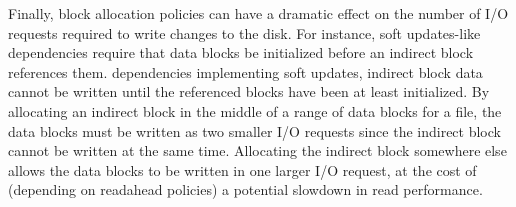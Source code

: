 \begin{comment}
The buffer cache and a few other \modules\ perform better in the
common case that each block's \patches\ are listed in order of creation
time,
%
taking $O(n)$ time to process $n$ patches rather than $O(n^2)$.
\end{comment}

Finally, block allocation policies can have a dramatic effect on the number of
I/O requests required to write changes to the disk. For instance, soft
updates-like dependencies require that data blocks be initialized before
an indirect block references them.   
dependencies implementing soft updates, indirect block data cannot be written
until the referenced blocks have been at least initialized. By allocating an
indirect block in the middle of a range of data blocks for a file, the data
blocks must be written as two smaller I/O requests since the indirect block
cannot be written at the same time. Allocating the indirect block somewhere
else allows the data blocks to be written in one larger I/O request, at the
cost of (depending on readahead policies) a potential slowdown in read performance.


\begin{comment}
Several functions in \Kudos\ iterate over lists of \patches\ looking for either
a single \patch\ or set of \patches\ satisfying some property, or trying to
process all the \patches\ in the list in some order determined by the dependency
graph. It is generally the case that the \patches\ satisfying the property or
the order in which the \patches\ should be processed can be determined very
quickly by keeping the lists sorted. For instance, the library function which
reverts \patches\ needs to perform the revert operations essentially in inverse
creation order, so that reverting a \patch\ which has since been overwritten
by a later \patch\ does the right thing. Keeping the list of all \patches\ on a
block sorted in creation order (which is very easy) makes this an efficient
operation, while it might otherwise take $O(n^2)$ time to execute. Similarly,
many \patch\ merging functions need to find for a given block some \patch\
which has no \befores\ on the same block, and the oldest \patch\ on a block
always satisfies this requirement.
\end{comment}
